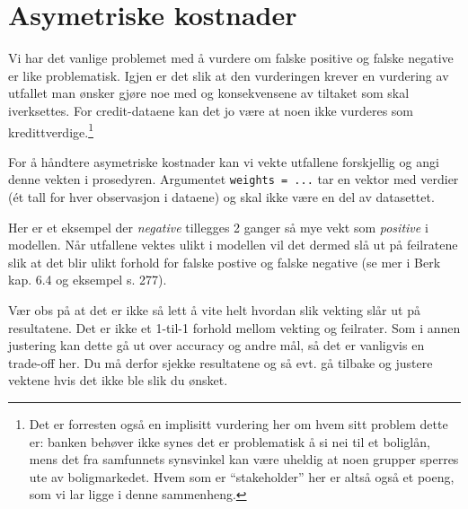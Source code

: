 \documentclass[
  letterpaper,
  DIV=11,
  numbers=noendperiod]{scrreprt}
\begin{document}
\section{Asymetriske kostnader}\label{asymetriske-kostnader-1}

Vi har det vanlige problemet med å vurdere om falske positive og falske
negative er like problematisk. Igjen er det slik at den vurderingen
krever en vurdering av utfallet man ønsker gjøre noe med og
konsekvensene av tiltaket som skal iverksettes. For credit-dataene kan
det jo være at noen ikke vurderes som kredittverdige.\footnote{Det er
  forresten også en implisitt vurdering her om hvem sitt problem dette
  er: banken behøver ikke synes det er problematisk å si nei til et
  boliglån, mens det fra samfunnets synsvinkel kan være uheldig at noen
  grupper sperres ute av boligmarkedet. Hvem som er ``stakeholder'' her
  er altså også et poeng, som vi lar ligge i denne sammenheng.}

For å håndtere asymetriske kostnader kan vi vekte utfallene forskjellig
og angi denne vekten i prosedyren. Argumentet \texttt{weights\ =\ ...}
tar en vektor med verdier (ét tall for hver observasjon i dataene) og
skal ikke være en del av datasettet.

Her er et eksempel der \emph{negative} tillegges 2 ganger så mye vekt
som \emph{positive} i modellen. Når utfallene vektes ulikt i modellen
vil det dermed slå ut på feilratene slik at det blir ulikt forhold for
falske postive og falske negative (se mer i Berk kap. 6.4 og eksempel s.
277).

Vær obs på at det er ikke så lett å vite helt hvordan slik vekting slår
ut på resultatene. Det er ikke et 1-til-1 forhold mellom vekting og
feilrater. Som i annen justering kan dette gå ut over accuracy og andre
mål, så det er vanligvis en trade-off her. Du må derfor sjekke
resultatene og så evt. gå tilbake og justere vektene hvis det ikke ble
slik du ønsket.
\end{document}
